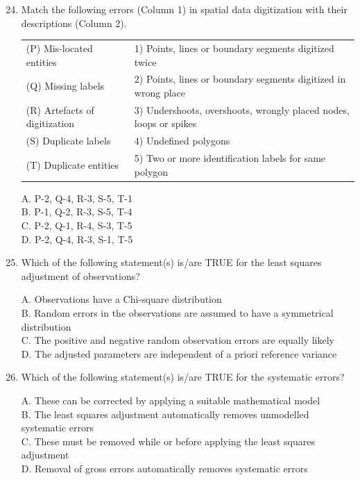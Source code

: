 \documentclass[journal,12pt,onecolumn]{IEEEtran}
\begin{document}
\begin{enumerate}
    \setcounter{enumi}{23}
    \item Match the following errors (Column 1) in spatial data digitization with their descriptions (Column 2). \\
    \begin{tabular}{ll}
    (P) Mis-located entities & 1) Points, lines or boundary segments digitized twice \\
    (Q) Missing labels & 2) Points, lines or boundary segments digitized in wrong place \\
    (R) Artefacts of digitization & 3) Undershoots, overshoots, wrongly placed nodes, loops or spikes \\
    (S) Duplicate labels & 4) Undefined polygons \\
    (T) Duplicate entities & 5) Two or more identification labels for same polygon
    \end{tabular}

    A. P-2, Q-4, R-3, S-5, T-1 \\
    B. P-1, Q-2, R-3, S-5, T-4 \\
    C. P-2, Q-1, R-4, S-3, T-5 \\
    D. P-2, Q-4, R-3, S-1, T-5

    \item Which of the following statement(s) is/are TRUE for the least squares adjustment of observations?

    A. Observations have a Chi-square distribution \\
    B. Random errors in the observations are assumed to have a symmetrical distribution \\
    C. The positive and negative random observation errors are equally likely \\
    D. The adjusted parameters are independent of a priori reference variance

    \item Which of the following statement(s) is/are TRUE for the systematic errors?

    A. These can be corrected by applying a suitable mathematical model \\
    B. The least squares adjustment automatically removes unmodelled systematic errors \\
    C. These must be removed while or before applying the least squares adjustment \\
    D. Removal of gross errors automatically removes systematic errors


\end{enumerate}
\end{document}
